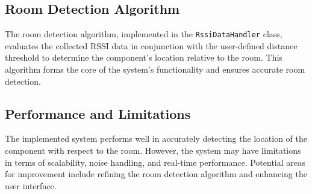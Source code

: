 \subsection{Room Detection Algorithm}
The room detection algorithm, implemented in the \texttt{RssiDataHandler} class, evaluates the collected RSSI data in conjunction with the user-defined distance threshold to determine the component's location relative to the room. This algorithm forms the core of the system's functionality and ensures accurate room detection.

\subsection{Performance and Limitations}
The implemented system performs well in accurately detecting the location of the component with respect to the room. However, the system may have limitations in terms of scalability, noise handling, and real-time performance. Potential areas for improvement include refining the room detection algorithm and enhancing the user interface.

